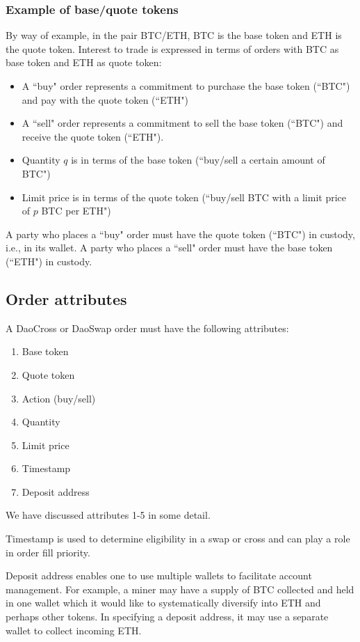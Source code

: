 \documentclass[11pt, reqno]{amsart}
\begin{document}
\subsubsection{Example of base/quote tokens}
By way of example, in the pair BTC/ETH, BTC is the base token and ETH is the
quote token. Interest to trade is expressed in terms of orders with BTC as
base token and ETH as quote token:
\begin{itemize}
	\item A ``buy" order represents a commitment to purchase the base token
	      (``BTC") and pay with the quote token (``ETH")
	\item A ``sell" order represents a commitment to sell the base token
	      (``BTC") and receive the quote token (``ETH").
	\item Quantity $q$ is in terms of the base token (``buy/sell a certain
	      amount of BTC")
	\item Limit price is in terms of the quote token (``buy/sell BTC with a
	      limit price of $p$ BTC per ETH")
\end{itemize}

A party who places a ``buy" order must have the quote token (``BTC") in custody,
i.e., in its wallet. A party who places a ``sell" order must have the base
token (``ETH") in custody.

\subsection{Order attributes}
A DaoCross or DaoSwap order must have the following attributes:
\begin{enumerate}
	\item Base token
	\item Quote token
	\item Action (buy/sell)
	\item Quantity
	\item Limit price
	\item Timestamp
	\item Deposit address
\end{enumerate}
We have discussed attributes 1-5 in some detail.

Timestamp is used to determine eligibility in a swap or cross and can play a
role in order fill priority.

Deposit address enables one to use multiple wallets to facilitate account
management. For example, a miner may have a supply of BTC collected and held in
one wallet which it would like to systematically diversify into ETH and perhaps
other tokens. In specifying a deposit address, it may use a separate wallet to
collect incoming ETH.
\end{document}
